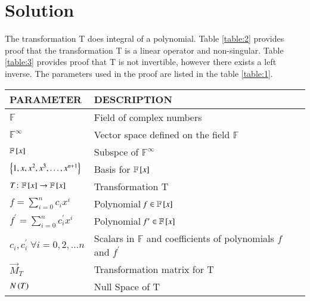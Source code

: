 \documentclass[journal,12pt,twocolumn]{IEEEtran}
\numberwithin{table}{section}
\begin{document}
\section{Solution}
The transformation T does integral of a polynomial. Table \ref{table:2} provides proof that the transformation T is a linear operator and non-singular. Table \ref{table:3} provides proof that T is not invertible, however there exists a left inverse. The parameters used in the proof are listed in the table \ref{table:1}.
\renewcommand{\thetable}{1}
\begin{table*}[ht!]
\begin{center}
\begin{tabular}{|l|l|}
\hline
\textbf{PARAMETER} & \textbf{DESCRIPTION}\\[0.5ex]
\hline
$\mathbb{F}$ & Field of complex numbers\\[0.5ex]
\hline
$\mathbb{F}^{\infty}$ & Vector space defined on the field $\mathbb{F}$\\[0.5ex]
\hline
$\mathbb{F}{}\left[x\right]$ & Subspce of $\mathbb{F}^{\infty}$ \\[0.5ex] 
\hline
$\left\{1,x,x^2,x^3,\hdots,x^{n+1}\right\}$ & Basis for $\mathbb{F}{}\left[x\right]$ \\[0.5ex] 
\hline
$T\colon \mathbb{F}{}\left[x\right] \rightarrow \mathbb{F}{}\left[x\right]$ & Transformation T\\[0.5ex] 
\hline
$\mathit{f}=\sum \limits_{i=0}^n c_i x^i$ & Polynomial $\mathit{f} \in \mathbb{F}{}\left[x\right]$\\[0.5ex] 
\hline
$\mathit{f^\prime}=\sum \limits_{i=0}^n c^\prime_i x^i$ & Polynomial $\mathit{f^\prime} \in \mathbb{F}{}\left[x\right]$\\[0.5ex] 
\hline
$c_i,c^\prime_i \; \forall i=0,2,\hdots n$ & Scalars in $\mathbb{F}$ and coefficients of polynomials $\mathit{f}$ and $\mathit{f^\prime}$\\[0.5ex] 
\hline
$\vec{M}_T$ & Transformation matrix for T\\[0.5ex] 
\hline
$N\left(T\right)$ & Null Space of T\\[0.5ex] 
\hline
\end{tabular}
\caption{Parameters}
\label{table:1}
\end{center}
\vspace{-0.5cm}
\end{table*}
\end{document}
